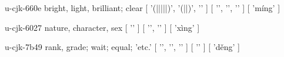 \begin{multicols}{2}
\lettrine[lines=3]{\cjkgGlue{}}{}\begin{minipage}{0.8\linewidth} u-cjk-660e  bright, light, brilliant; clear  [ '\cjkgGlue{}(\cjkgGlue{}|\cjkgGlue{}|\cjkgGlue{}|\cjkgGlue{}|\cjkgGlue{}|\cjkgGlue{})', '\cjkgGlue{}(\cjkgGlue{}|\cjkgGlue{}|\cjkgGlue{})', '\cjkgGlue{}' ]  [ '\cjkgGlue{}', '\cjkgGlue{}', '\cjkgGlue{}' ]  [ 'míng' ] \end{minipage}

\lettrine[lines=3]{\cjkgGlue{}}{}\begin{minipage}{0.8\linewidth} u-cjk-6027  nature, character, sex  [ '\cjkgGlue{}' ]  [ '\cjkgGlue{}', '\cjkgGlue{}' ]  [ 'xìng' ] \end{minipage}

\lettrine[lines=3]{\cjkgGlue{}}{}\begin{minipage}{0.8\linewidth} u-cjk-7b49  rank, grade; wait; equal; 'etc.'  [ '\cjkgGlue{}', '\cjkgGlue{}', '\cjkgGlue{}' ]  [ '\cjkgGlue{}' ]  [ 'děng' ] \end{minipage}


\end{multicols}
